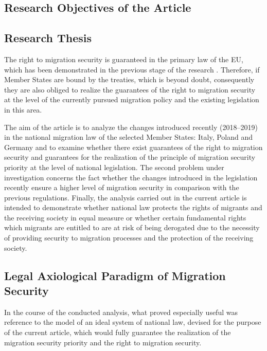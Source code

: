 \documentclass[10pt,a4paper]{article}
\begin{document}
\begin{multicols}{2}
\section{Research Objectives of the Article}

\subsection{Research Thesis}

\noindent The right to migration security is guaranteed in the primary law of the EU, which has been demonstrated in the previous stage of the research \citep{R11}. Therefore, if Member States are bound by the treaties, which is beyond doubt, consequently they are also obliged to realize the guarantees of the right to migration security at the level of the currently pursued migration policy and the existing legislation in this area.

The aim of the article is to analyze the changes introduced recently (2018--2019) in the national migration law of the selected Member States: Italy, Poland and Germany and to examine whether there exist guarantees of the right to migration security and guarantees for the realization of the principle of migration security priority at the level of national legislation. The second problem under investigation concerns the fact whether the changes introduced in the legislation recently ensure a higher level of migration security in comparison with the previous regulations. Finally, the analysis carried out in the current article is intended to demonstrate whether national law protects the rights of migrants and the receiving society in equal measure or whether certain fundamental rights which migrants are entitled to are at risk of being derogated due to the necessity of providing security to migration processes and the protection of the receiving society.

\subsection{Legal Axiological Paradigm of Migration Security}

\noindent In the course of the conducted analysis, what proved especially useful was reference to the model of an ideal system of national law, devised for the purpose of the current article, which would fully guarantee the realization of the migration security priority and the right to migration security. 


\end{multicols}
\end{document}
